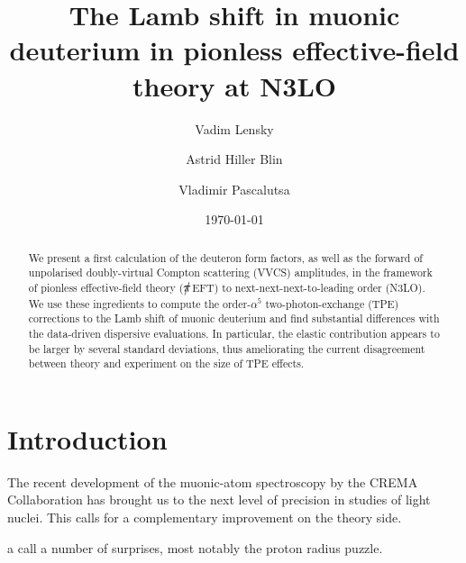\documentclass[prl,
twocolumn,
showpacs,preprintnumbers,amsmath,amssymb,
superscriptaddress,
a4paper,nofootinbib,longbibliography]{revtex4-2}
\begin{document}


\author{Vadim Lensky}
\author{Astrid Hiller Blin}
\author{Vladimir Pascalutsa}

\title{The Lamb shift in muonic deuterium in pionless effective-field theory at N3LO}

\begin{abstract}
We present a first calculation of the deuteron form factors, as well as 
the forward of unpolarised doubly-virtual Compton scattering (VVCS) amplitudes, 
in the framework of pionless effective-field theory ($\slashed{\pi}$EFT) to next-next-next-to-leading order (N3LO). We use these ingredients to compute the order-$\alpha^5$ two-photon-exchange (TPE) corrections to the Lamb shift of muonic deuterium and find substantial differences with the data-driven dispersive evaluations.
In particular,  the elastic contribution appears to be larger by several standard deviations, thus ameliorating the
current disagreement between theory and experiment on the size of TPE effects.
\end{abstract}

\date{\today}


\maketitle


\tableofcontents
\newpage

\section{Introduction}

The recent development of the muonic-atom spectroscopy by the CREMA Collaboration has brought us to the next level of precision in studies of 
light nuclei. This calls for a complementary improvement on the theory side.

a call
a number of surprises, most notably the
proton radius puzzle. 
\end{document}
